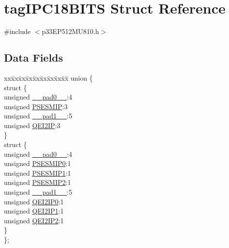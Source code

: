 \hypertarget{structtag_i_p_c18_b_i_t_s}{}\section{tag\+I\+P\+C18\+B\+I\+TS Struct Reference}
\label{structtag_i_p_c18_b_i_t_s}


{\ttfamily \#include $<$p33\+E\+P512\+M\+U810.\+h$>$}

\subsection*{Data Fields}
\begin{DoxyCompactItemize}
\item 
\begin{tabbing}
xx\=xx\=xx\=xx\=xx\=xx\=xx\=xx\=xx\=\kill
union \{\\
\>struct \{\\
\>\>unsigned \hyperlink{structtag_i_p_c18_b_i_t_s_adf71f3d8410c1f1dbbc96680a92c49af}{\_\_pad0\_\_}:4\\
\>\>unsigned \hyperlink{structtag_i_p_c18_b_i_t_s_acac177c19a5ffdd93baf0234702d5da4}{PSESMIP}:3\\
\>\>unsigned \hyperlink{structtag_i_p_c18_b_i_t_s_acaf2d0924a107ec6e8d2e31febaf66f9}{\_\_pad1\_\_}:5\\
\>\>unsigned \hyperlink{structtag_i_p_c18_b_i_t_s_ad321de0de77fc166ff405a8ba7e2141e}{QEI2IP}:3\\
\>\} \\
\>struct \{\\
\>\>unsigned \hyperlink{structtag_i_p_c18_b_i_t_s_adf71f3d8410c1f1dbbc96680a92c49af}{\_\_pad0\_\_}:4\\
\>\>unsigned \hyperlink{structtag_i_p_c18_b_i_t_s_a3c170eeeef875cdbbfb5ccf89664b2ef}{PSESMIP0}:1\\
\>\>unsigned \hyperlink{structtag_i_p_c18_b_i_t_s_a661bf0d0e528ea0a2a0203e7a49d9684}{PSESMIP1}:1\\
\>\>unsigned \hyperlink{structtag_i_p_c18_b_i_t_s_a6906eff51d1ef58d547c90008739a7f0}{PSESMIP2}:1\\
\>\>unsigned \hyperlink{structtag_i_p_c18_b_i_t_s_acaf2d0924a107ec6e8d2e31febaf66f9}{\_\_pad1\_\_}:5\\
\>\>unsigned \hyperlink{structtag_i_p_c18_b_i_t_s_af85fda78fac3fc44b856eab2bc750ffd}{QEI2IP0}:1\\
\>\>unsigned \hyperlink{structtag_i_p_c18_b_i_t_s_ae84a5f413b2c93389695a6db467546c7}{QEI2IP1}:1\\
\>\>unsigned \hyperlink{structtag_i_p_c18_b_i_t_s_a9be23f0b4c92949a6e7c7c2cc83e0617}{QEI2IP2}:1\\
\>\} \\
\}; \\

\end{tabbing}\end{DoxyCompactItemize}


